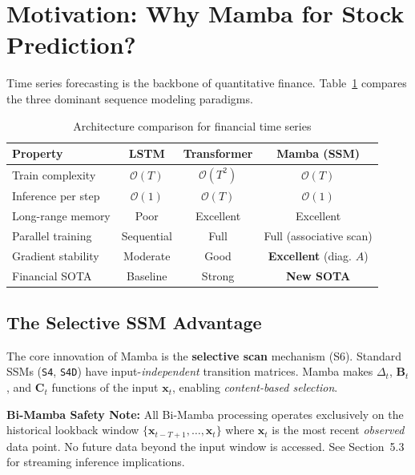 \documentclass[11pt,a4paper]{article}
\begin{document}
\section{Motivation: Why Mamba for Stock Prediction?}

Time series forecasting is the backbone of quantitative finance. Table~\ref{tab:comparison}
compares the three dominant sequence modeling paradigms.

\begin{table}[h]
\centering
\caption{Architecture comparison for financial time series}
\label{tab:comparison}
\begin{tabular}{lccc}
\toprule
Property & LSTM & Transformer & \textbf{Mamba (SSM)} \\
\midrule
Train complexity & $\mathcal{O}(T)$ & $\mathcal{O}(T^2)$ & $\mathcal{O}(T)$ \\
Inference per step & $\mathcal{O}(1)$ & $\mathcal{O}(T)$ & $\mathcal{O}(1)$ \\
Long-range memory & Poor & Excellent & Excellent \\
Parallel training & Sequential & Full & Full (associative scan) \\
Gradient stability & Moderate & Good & \textbf{Excellent} (diag. $A$) \\
Financial SOTA & Baseline & Strong & \textbf{New SOTA} \\
\bottomrule
\end{tabular}
\end{table}

\subsection{The Selective SSM Advantage}

The core innovation of Mamba is the \textbf{selective scan} mechanism (S6).
Standard SSMs (\texttt{S4}, \texttt{S4D}) have input-\textit{independent}
transition matrices. Mamba makes $\Delta_t$, $\mathbf{B}_t$, and $\mathbf{C}_t$
functions of the input $\mathbf{x}_t$, enabling \textit{content-based
selection}.

\textbf{Bi-Mamba Safety Note:} All Bi-Mamba processing operates exclusively on the historical lookback window $\{\mathbf{x}_{t-T+1}, \ldots, \mathbf{x}_t\}$ where $\mathbf{x}_t$ is the most recent \emph{observed} data point. No future data beyond the input window is accessed. See Section~5.3 for streaming inference implications.
\end{document}
